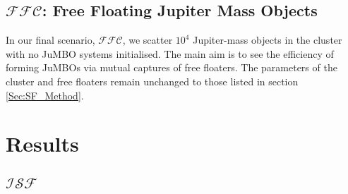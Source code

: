\documentclass[aa]{aa}
\begin{document}
    \subsection{$\mathcal{FFC}$: Free Floating Jupiter Mass Objects}
    In our final scenario, $\mathcal{FFC}$, we scatter $10^{4}$ Jupiter-mass objects in the cluster with no JuMBO systems initialised. The main aim is to see the efficiency of forming JuMBOs via mutual captures of free floaters. The parameters of the cluster and free floaters remain unchanged to those listed in section \ref{Sec:SF_Method}.

\section{Results}
\subsection{$\mathcal{ISF}$}
\end{document}
